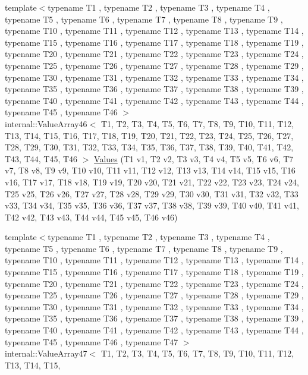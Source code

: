 \begin{DoxyCompactItemize}
{\footnotesize template$<$typename T1 , typename T2 , typename T3 , typename T4 , typename T5 , typename T6 , typename T7 , typename T8 , typename T9 , typename T10 , typename T11 , typename T12 , typename T13 , typename T14 , typename T15 , typename T16 , typename T17 , typename T18 , typename T19 , typename T20 , typename T21 , typename T22 , typename T23 , typename T24 , typename T25 , typename T26 , typename T27 , typename T28 , typename T29 , typename T30 , typename T31 , typename T32 , typename T33 , typename T34 , typename T35 , typename T36 , typename T37 , typename T38 , typename T39 , typename T40 , typename T41 , typename T42 , typename T43 , typename T44 , typename T45 , typename T46 $>$ }\\internal\-::\-Value\-Array46$<$ \-T1, \-T2, \*
\-T3, \-T4, \-T5, \-T6, \-T7, \-T8, \-T9, \*
\-T10, \-T11, \-T12, \-T13, \-T14, \-T15, \*
\-T16, \-T17, \-T18, \-T19, \-T20, \-T21, \*
\-T22, \-T23, \-T24, \-T25, \-T26, \-T27, \*
\-T28, \-T29, \-T30, \-T31, \-T32, \-T33, \*
\-T34, \-T35, \-T36, \-T37, \-T38, \-T39, \*
\-T40, \-T41, \-T42, \-T43, \-T44, \-T45, \*
\-T46 $>$ \hyperlink{namespacetesting_a8f5536906a9d6780467c8ae53a420dad}{\-Values} (\-T1 v1, \-T2 v2, \-T3 v3, \-T4 v4, \-T5 v5, \-T6 v6, \-T7 v7, \-T8 v8, \-T9 v9, \-T10 v10, \-T11 v11, \-T12 v12, \-T13 v13, \-T14 v14, \-T15 v15, \-T16 v16, \-T17 v17, \-T18 v18, \-T19 v19, \-T20 v20, \-T21 v21, \-T22 v22, \-T23 v23, \-T24 v24, \-T25 v25, \-T26 v26, \-T27 v27, \-T28 v28, \-T29 v29, \-T30 v30, \-T31 v31, \-T32 v32, \-T33 v33, \-T34 v34, \-T35 v35, \-T36 v36, \-T37 v37, \-T38 v38, \-T39 v39, \-T40 v40, \-T41 v41, \-T42 v42, \-T43 v43, \-T44 v44, \-T45 v45, \-T46 v46)
\item 
{\footnotesize template$<$typename T1 , typename T2 , typename T3 , typename T4 , typename T5 , typename T6 , typename T7 , typename T8 , typename T9 , typename T10 , typename T11 , typename T12 , typename T13 , typename T14 , typename T15 , typename T16 , typename T17 , typename T18 , typename T19 , typename T20 , typename T21 , typename T22 , typename T23 , typename T24 , typename T25 , typename T26 , typename T27 , typename T28 , typename T29 , typename T30 , typename T31 , typename T32 , typename T33 , typename T34 , typename T35 , typename T36 , typename T37 , typename T38 , typename T39 , typename T40 , typename T41 , typename T42 , typename T43 , typename T44 , typename T45 , typename T46 , typename T47 $>$ }\\internal\-::\-Value\-Array47$<$ \-T1, \-T2, \*
\-T3, \-T4, \-T5, \-T6, \-T7, \-T8, \-T9, \*
\-T10, \-T11, \-T12, \-T13, \-T14, \-T15, \*

\end{DoxyCompactItemize}
